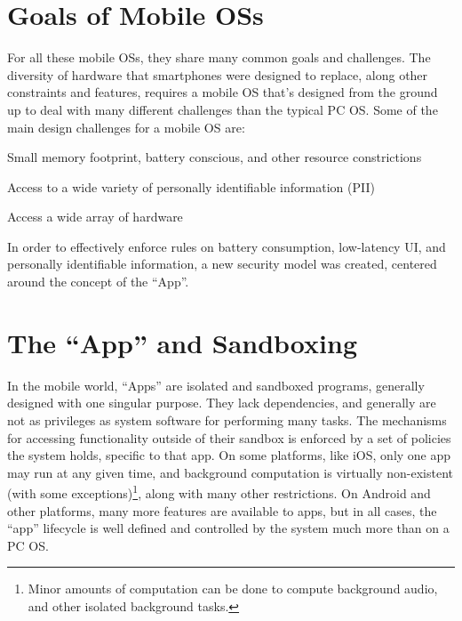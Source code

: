 \section{Goals of Mobile OSs}
For all these mobile OSs, they share many common goals and challenges. The diversity of hardware that smartphones were designed to replace, along other constraints and features, requires a mobile OS that's designed from the ground up to deal with many different challenges than the typical PC OS. Some of the main design challenges for a mobile OS are: 
\begin{smitemize}

\item Small memory footprint, battery conscious, and other resource constrictions

\item Access to a wide variety of personally identifiable information (PII)

\item Access a wide array of hardware

\end{smitemize}
In order to effectively enforce rules on battery consumption, low-latency UI, and personally identifiable information, a new security model was created, centered around the concept of the ``App''. 



\section{The ``App'' and Sandboxing}

In the mobile world, ``Apps'' are isolated and sandboxed programs, generally designed with one singular purpose. They lack dependencies, and generally are not as privileges as system software for performing many tasks. The mechanisms for accessing functionality outside of their sandbox is enforced by a set of policies the system holds, specific to that app. On some platforms, like iOS, only one app may run at any given time, and background computation is virtually non-existent (with some exceptions)\footnote{Minor amounts of computation can be done to compute background audio, and other isolated background tasks.}, along with many other restrictions. On Android and other platforms, many more features are available to apps, but in all cases, the ``app'' lifecycle is well defined and controlled by the system much more than on a PC OS.

